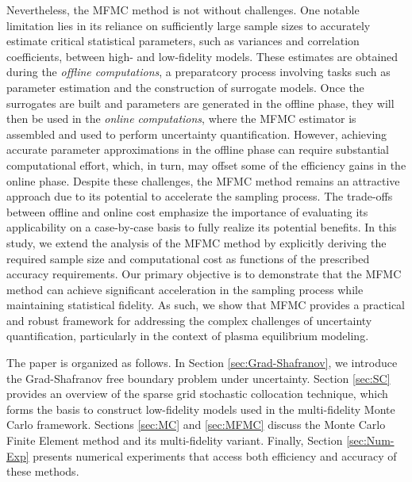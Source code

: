 Nevertheless, the MFMC method is not without challenges. One notable limitation lies in its reliance on sufficiently large sample sizes to accurately estimate critical statistical parameters, such as variances and correlation coefficients, between high- and low-fidelity models. These estimates are obtained during the \textit{offline computations}, a preparatcory process involving tasks such as parameter estimation and the construction of surrogate models. Once the surrogates are built and parameters are generated in the offline phase, they will then be used in the \textit{online computations}, where the MFMC estimator is assembled and used to perform uncertainty quantification. However, achieving accurate parameter approximations in the offline phase can require substantial computational effort, which, in turn, may offset some of the efficiency gains in the online phase. Despite these challenges, the MFMC method remains an attractive approach due to its potential to accelerate the sampling process. The trade-offs between offline and online cost emphasize the importance of evaluating its applicability on a case-by-case basis to fully realize its potential benefits. In this study, we extend the analysis of the MFMC method \cite{PeWiGu:2016} by explicitly deriving the required sample size and computational cost as functions of the prescribed accuracy requirements. Our primary objective is to demonstrate that the MFMC method can achieve significant acceleration in the sampling process while maintaining statistical fidelity. As such, we show that MFMC provides a practical and robust framework for addressing the complex challenges of uncertainty quantification, particularly in the context of plasma equilibrium modeling.


 
The paper is organized as follows. In Section \ref{sec:Grad-Shafranov}, we introduce the Grad-Shafranov free boundary problem under uncertainty. Section \ref{sec:SC} provides an overview of the sparse grid stochastic collocation technique, which forms the basis to construct low-fidelity models used in the multi-fidelity Monte Carlo framework. Sections \ref{sec:MC} and \ref{sec:MFMC} discuss the Monte Carlo Finite Element method and its multi-fidelity variant. Finally, Section \ref{sec:Num-Exp} presents numerical experiments that access both efficiency and accuracy of these methods.



